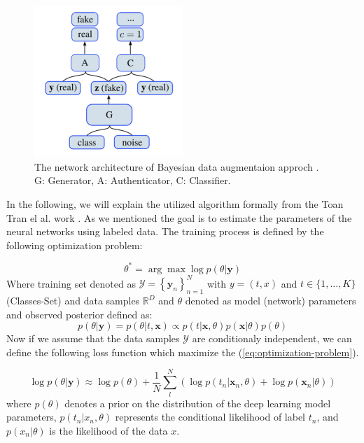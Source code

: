 \begin{figure}
  \centering
  \label{fig:bayesian-approach-gan-architecture}
  \includegraphics[width=0.5\textwidth]{fig/bayesian-approach-gan-architecture}
  \caption{The network architecture of Bayesian data augmentaion approch \cite{refrence_bayesian_approach}. G: Generator, A: Authenticator, C: Classifier.}
\end{figure}

In the following, we will explain the utilized algorithm formally from the Toan Tran el al. work \cite{refrence_bayesian_approach}. As we mentioned the goal is to estimate the parameters of the neural networks using labeled data. The training process is defined by the following optimization problem:

\begin{equation} \label{eq:optimization-problem}
  \theta^{*}=\arg \max \log p(\theta | \mathbf{y})
\end{equation}
Where training set denoted as $\mathcal{Y}=\left\{\mathbf{y}_{n}\right\}_{n=1}^{N}$ with $y=(t,x)$
and $t\in\{1, ..., K\}$ (Classes-Set) and data samples $\mathbb{R}^D$ and $\theta$ denoted as
model (network) parameters and observed posterior defined as:
\begin{equation} \label{eq:observed-posterior}
  p(\theta | \mathbf{y})=p(\theta | t, \mathbf{x}) \propto p(t | \mathbf{x}, \theta) p(\mathbf{x} | \theta) p(\theta)
\end{equation}
Now if we assume that the data samples $\mathcal{Y}$ are conditionaly independent, we can define the
following loss function which maximize the (\ref{eq:optimization-problem}).

\begin{equation} \label{eq:loss-function}
  \log p(\theta | \mathbf{y}) \approx \log p(\theta)+\frac{1}{N} \sum_{l}^{N}\left(\log p\left(t_{n} | \mathbf{x}_{n}, \theta\right)+\log p\left(\mathbf{x}_{n} | \theta\right)\right)
\end{equation}
where $p(\theta)$ denotes a prior on the distribution of the deep learning model parameters, $p(t_n|x_n, \theta)$
represents the conditional likelihood of label $t_n$, and $p(x_n|\theta)$ is the likelihood of the
data $x$.


